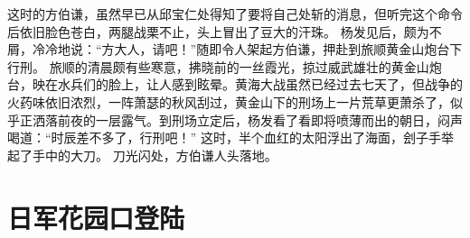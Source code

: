 \documentclass[12pt,UTF8]{ctexbook}
\begin{document}
这时的方伯谦，虽然早已从邱宝仁处得知了要将自己处斩的消息，但听完这个命令后依旧脸色苍白，两腿战栗不止，头上冒出了豆大的汗珠。
杨发见后，颇为不屑，冷冷地说：“方大人，请吧！”随即令人架起方伯谦，押赴到旅顺黄金山炮台下行刑。
旅顺的清晨颇有些寒意，拂晓前的一丝霞光，掠过威武雄壮的黄金山炮台，映在水兵们的脸上，让人感到眩晕。黄海大战虽然已经过去七天了，但战争的火药味依旧浓烈，一阵萧瑟的秋风刮过，黄金山下的刑场上一片荒草更萧杀了，似乎正洒落前夜的一层露气。到刑场立定后，杨发看了看即将喷薄而出的朝日，闷声喝道：“时辰差不多了，行刑吧！”
这时，半个血红的太阳浮出了海面，刽子手举起了手中的大刀。
刀光闪处，方伯谦人头落地。

\chapter{日军花园口登陆}
\end{document}
